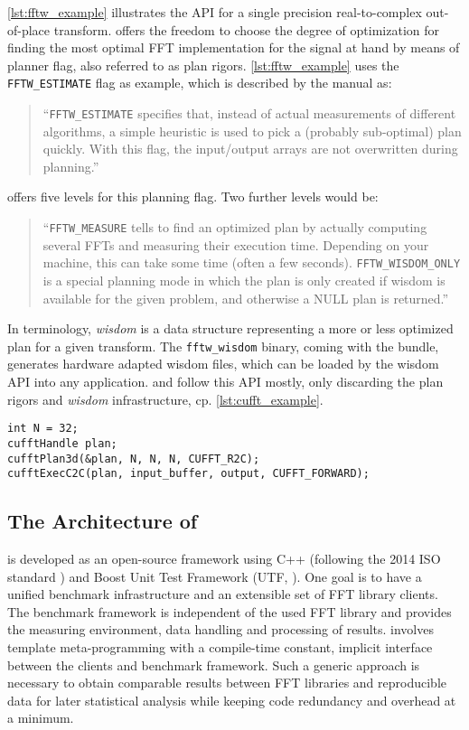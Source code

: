 \cref{lst:fftw_example} illustrates the \fftw{} API for a single precision real-to-complex out-of-place transform. \fftw{} offers the freedom to choose the degree of optimization for finding the most optimal FFT implementation for the signal at hand by means of planner flag, also referred to as plan rigors. \cref{lst:fftw_example} uses the \texttt{FFTW\_ESTIMATE} flag as example, which is described by the \fftw{} manual \cite{fftw_manual} as:
%
\begin{quote}
``\texttt{FFTW\_ESTIMATE} specifies that, instead of actual measurements of different algorithms, a simple heuristic is used to pick a (probably sub-optimal) plan quickly. With this flag, the input/output arrays are not overwritten during planning.''
\end{quote}
%
\fftw{} offers five levels for this planning flag. Two further levels would be:
\begin{quote}
``\texttt{FFTW\_MEASURE} tells \fftw{} to find an optimized plan by actually computing several FFTs and measuring their execution time. Depending on your machine, this can take some time (often a few seconds).\newline
\texttt{FFTW\_WISDOM\_ONLY} is a special planning mode in which the plan is only created if wisdom is available for the given problem, and otherwise a NULL plan is returned.''
\end{quote}
%
In \fftw{} terminology, \emph{wisdom} is a data structure representing a more or less optimized plan for a given transform. The \texttt{fftw\_wisdom} binary, coming with the \fftw{} bundle, generates hardware adapted wisdom files, which can be loaded by the wisdom API into any \fftw{} application.
%
\cufft{} and \clfft{} follow this API mostly, only discarding the plan rigors and \emph{wisdom} infrastructure, cp. \cref{lst:cufft_example}.

\begin{lstlisting}[caption={Minimal usage example of the \cufft{} single precision real-to-complex planner API. Memory management is omitted.},label={lst:cufft_example}]
int N = 32;
cufftHandle plan;
cufftPlan3d(&plan, N, N, N, CUFFT_R2C);
cufftExecC2C(plan, input_buffer, output, CUFFT_FORWARD);
\end{lstlisting}

\subsection{The Architecture of \gearshifft{}}
\label{ssec:gearshifft_arch}
\gearshifft{} is developed as an open-source framework using C++ (following the 2014 ISO standard \cite{cpp14std}) and Boost Unit Test Framework (UTF, \cite{boost}). One goal is to have a unified benchmark infrastructure and an extensible set of FFT library clients. 
The benchmark framework is independent of the used FFT library and provides the measuring environment, data handling and processing of results. \gearshifft{} involves template meta-programming with a compile-time constant, implicit interface between the clients and benchmark framework. Such a generic approach is necessary to obtain comparable results between FFT libraries and reproducible data for later statistical analysis while keeping code redundancy and overhead at a minimum. 

